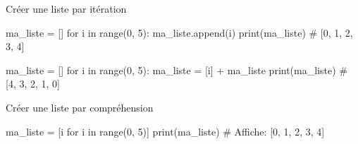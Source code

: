 \pagebreak

\begin{easybox}{Créer une liste par itération}{}

\begin{minipage}{0.48\linewidth}
		\begin{CodePythontexAlt}[TaillePolice=\normalsize, Largeur=1\linewidth,Centre,PremLigne=1, Lignes=true,]{}
ma_liste = []
for i in range(0, 5):
	ma_liste.append(i)
print(ma_liste)	# [0, 1, 2, 3, 4]
		\end{CodePythontexAlt}
	\end{minipage}\hfill
	\begin{minipage}{0.48\linewidth}
		\begin{CodePythontexAlt}[TaillePolice=\normalsize, Largeur=1\linewidth,Centre,PremLigne=1]{}
ma_liste = []
for i in range(0, 5):
	ma_liste = [i] + ma_liste
print(ma_liste) # [4, 3, 2, 1, 0]
		
		\end{CodePythontexAlt}
	\end{minipage}
\end{easybox}

\begin{easybox}{Créer une liste par compréhension}{}

	\begin{CodePythontexAlt}[TaillePolice=\normalsize, Largeur=1\linewidth,Centre,PremLigne=1]{}
ma_liste = [i for i in range(0, 5)]
print(ma_liste)		# Affiche: [0, 1, 2, 3, 4]
		\end{CodePythontexAlt}
		\end{easybox}

